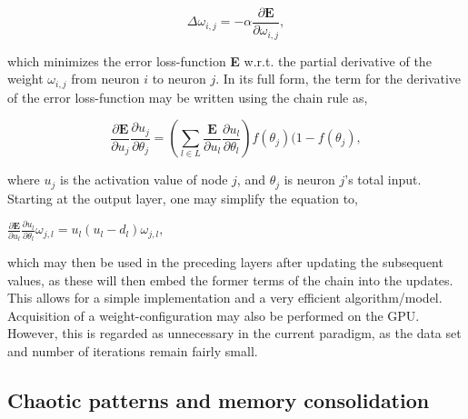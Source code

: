 \begin{equation}
    \Delta \omega_{i,j} = -\alpha \frac{\partial \textbf{E}}{\partial \omega_{i,j}},
\end{equation}

\noindent
which minimizes the error loss-function \textbf{E} w.r.t. the partial derivative of the weight $\omega_{i,j}$ from neuron $i$ to neuron $j$.
In its full form, the term for the derivative of the error loss-function may be written using the chain rule as,

\begin{equation}
    \frac{\partial \textbf{E}}{\partial u_j}\frac{\partial u_j}{\partial \theta_j} = 
    (\sum_{l \in L}\frac{\textbf{E}}{\partial u_l}\frac{\partial u_l}{\partial \theta_l}) f(\theta_j)(1-f(\theta_j),
\end{equation}

\noindent
where $u_j$ is the activation value of node $j$, and $\theta_j$ is neuron $j$'s total input. Starting at the output layer, one may simplify the equation to,

\begin{center}
\begin{math}
    \frac{\partial \textbf{E}}{\partial u_l} \frac{\partial u_l}{\partial \theta_l} \omega_{j,l} = 
    u_l (u_l - d_l) \omega_{j,l},
\end{math}
\end{center}

which may then be used in the preceding layers after updating the subsequent values, as these will then embed the former terms of the chain into the updates. This allows for a simple implementation and a very efficient algorithm/model. Acquisition of a weight-configuration may also be performed on the GPU. However, this is regarded as unnecessary in the current paradigm, as the data set and number of iterations remain fairly small.



\subsection{Chaotic patterns and memory consolidation}\label{subsection:hpc-pseudopatterns}

